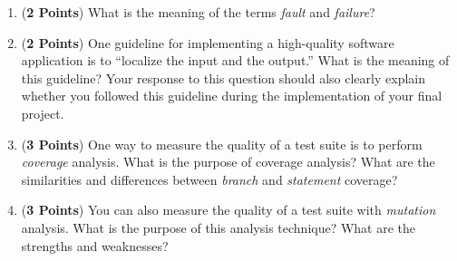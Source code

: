 \documentclass[12pt,epsf,psfig,graphics]{article}
\newtheorem{define}{Definition}
\begin{document}
\begin{enumerate}
\begin{enumerate}

  \item ({\bf 2 Points}) What is the meaning of the terms {\em fault}
    and {\em failure}?

  \item ({\bf 2 Points}) One guideline for implementing a high-quality
    software application is to ``localize the input and the output.''
    What is the meaning of this guideline?  Your response to this
    question should also clearly explain whether you followed this
    guideline during the implementation of your final project.

  \item ({\bf 3 Points}) One way to measure the quality of a test suite is to perform {\em coverage} analysis. What is
    the purpose of coverage analysis? What are the similarities and differences between {\em branch} and {\em statement}
    coverage?

  \item ({\bf 3 Points}) You can also measure the quality of a test suite with {\em mutation} analysis. What is the
    purpose of this analysis technique? What are the strengths and weaknesses?



\end{enumerate}





\end{enumerate}
\end{document}
